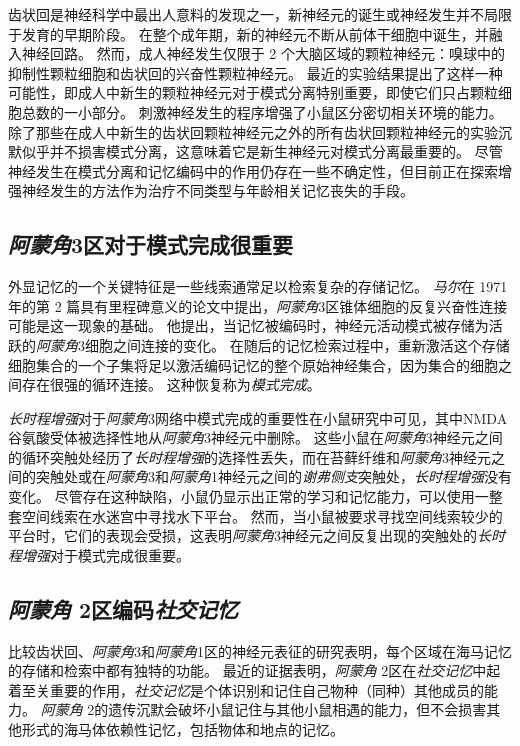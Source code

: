 齿状回是神经科学中最出人意料的发现之一，新神经元的诞生或神经发生并不局限于发育的早期阶段。
在整个成年期，新的神经元不断从前体干细胞中诞生，并融入神经回路。
然而，成人神经发生仅限于 2 个大脑区域的颗粒神经元：嗅球中的抑制性颗粒细胞和齿状回的兴奋性颗粒神经元。
最近的实验结果提出了这样一种可能性，即成人中新生的颗粒神经元对于模式分离特别重要，即使它们只占颗粒细胞总数的一小部分。
刺激神经发生的程序增强了小鼠区分密切相关环境的能力。
除了那些在成人中新生的齿状回颗粒神经元之外的所有齿状回颗粒神经元的实验沉默似乎并不损害模式分离，这意味着它是新生神经元对模式分离最重要的。
尽管神经发生在模式分离和记忆编码中的作用仍存在一些不确定性，但目前正在探索增强神经发生的方法作为治疗不同类型与年龄相关记忆丧失的手段。



\subsection{\textit{阿蒙角}3区对于模式完成很重要}

外显记忆的一个关键特征是一些线索通常足以检索复杂的存储记忆。
\textit{马尔}在 1971 年的第 2 篇具有里程碑意义的论文中提出，\textit{阿蒙角}3区锥体细胞的反复兴奋性连接可能是这一现象的基础\cite{marr1991simple}。
他提出，当记忆被编码时，神经元活动模式被存储为活跃的\textit{阿蒙角}3细胞之间连接的变化。
在随后的记忆检索过程中，重新激活这个存储细胞集合的一个子集将足以激活编码记忆的整个原始神经集合，因为集合的细胞之间存在很强的循环连接。
这种恢复称为\textit{模式完成}。


\textit{长时程增强}对于\textit{阿蒙角}3网络中模式完成的重要性在小鼠研究中可见，其中NMDA谷氨酸受体被选择性地从\textit{阿蒙角}3神经元中删除。
这些小鼠在\textit{阿蒙角}3神经元之间的循环突触处经历了\textit{长时程增强}的选择性丢失，而在苔藓纤维和\textit{阿蒙角}3神经元之间的突触处或在\textit{阿蒙角}3和\textit{阿蒙角}1神经元之间的\textit{谢弗侧支}突触处，\textit{长时程增强}没有变化。
尽管存在这种缺陷，小鼠仍显示出正常的学习和记忆能力，可以使用一整套空间线索在水迷宫中寻找水下平台。
然而，当小鼠被要求寻找空间线索较少的平台时，它们的表现会受损，这表明\textit{阿蒙角}3神经元之间反复出现的突触处的\textit{长时程增强}对于模式完成很重要。



\subsection{\textit{阿蒙角} 2区编码\textit{社交记忆}}

比较齿状回、\textit{阿蒙角}3和\textit{阿蒙角}1区的神经元表征的研究表明，每个区域在海马记忆的存储和检索中都有独特的功能。
最近的证据表明，\textit{阿蒙角} 2区在\textit{社交记忆}中起着至关重要的作用，\textit{社交记忆}是个体识别和记住自己物种（同种）其他成员的能力。
\textit{阿蒙角} 2的遗传沉默会破坏小鼠记住与其他小鼠相遇的能力，但不会损害其他形式的海马体依赖性记忆，包括物体和地点的记忆。


